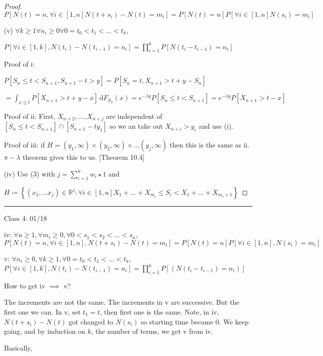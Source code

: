 \documentclass{article}
\theoremstyle{definition}
\begin{document}
\begin{proof}
    \(P[N(t)=n, \forall i\in [1,n] N(t+s_i)-N(t)=m_i]=P[N(t)=n]P[\forall i\in [1,n] N(s_i)=m_i]\)
    
    (v) \(\forall k\geq 1 \forall n_i \geq 0 \forall 0=t_0<t_1<\dots <t_k\), 
    
    \(P[\forall i\in [1,k], N(t_i)-N(t_{i-1})=n_i]=\displaystyle \prod_{i=1}^{k} P[N(t_i - t_{i-1} )=n_i]\) 

    Proof of i:

    \(P[S_n \leq t< S_{n+1}, S_{n+1}-t > y]=P[S_n=t,X_{n+1}> t+y-S_n]\)
    
    \(\displaystyle = \int_{x \leq t}^{} P[X_{n+1}>t+y-x] \,\mathrm{d}F_{S_n}(x)= e^{-\lambda y}P[S_n \leq t < S_{n+1}] =e^{-\lambda y} P[X_{n+1}>t-x]\) 

    Proof of ii: First, \(X_{n+2},\dots ,X_{n+j}\) are independent of \([S_n \leq t < S_{n+1}] \cap [S_{n+1}-t  y_1]\) so we an take out \(X_{n+i}>y_i\) and use (i).
    
    Proof of iii: if \(H = (y_1,\infty)\times (y_2,\infty)\times \dots (y_j,\infty)\) then this is the same as ii. \(\pi-\lambda\) theorem gives  this to us. [Theorem 10.4]

    (iv) Use (3) with \(j=\sum_{i=1}^u w_i \star 1\) and
    
    \(H\coloneqq \left\{ (x_1,\dots x_j)\in\mathbb{R} ^j: \forall i\in [1,u]X_1 + \dots + X_{m_i} \leq S_i < X_1 + \dots +X_{m_i +1}  \right\} \)


\end{proof}

\hrule
\hfill

Class 4: 01/18

iv: \(\forall u \geq 1, \forall m_i \geq 0, \forall 0 < s_{1}<s_{2}<\dots <s_{n}\), \(P[N(t)=n, \forall i\in [1,n], N(t+s_{i} )-N(t)=m_i] = P[N(t)=n]P[\forall i\in [1,n], N(s_i)=m_i]\)

v: \(\forall n_i \geq 0, \forall k \geq 1, \forall 0 = t_0 < t_1 < \dots < t_k\), \(P[\forall i\in [1,k], N(t_i)-N(t_{i-1} )=n_i] = \prod_{i=1}^{k} P[(N(t_{i} - t_{i-1}  ) = n_i)]\) 

How to get iv \(\implies \) v?

The increments are not the same. The increments in v are successive. But the first one we can. In v, set \(t_1=t\), then first one is the same. Note, in iv, \(N(t+s_i)-N(t)\) got changed to \(N(s_i)\) so starting time became $0$. We keep going, and by induction on \(k\), the number of terms, we get v from iv.

Basically,
\end{document}
